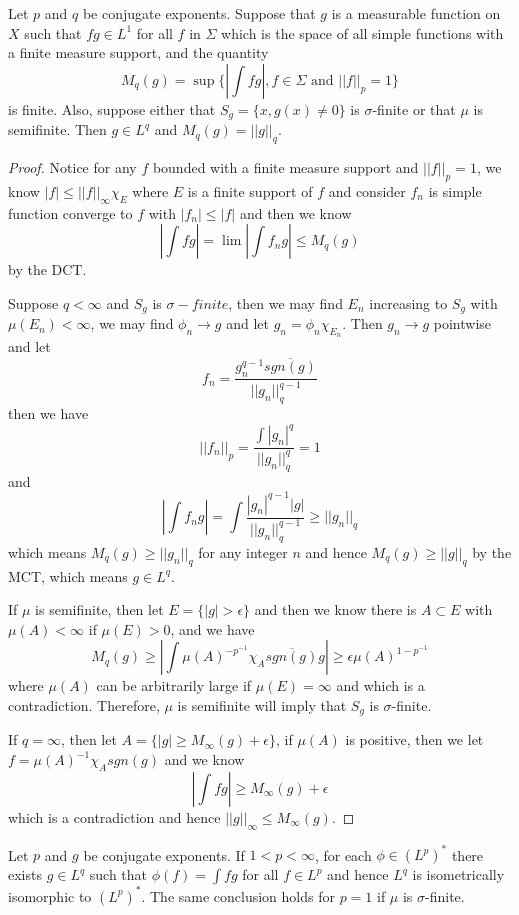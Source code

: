 \begin{theorem}
    Let $p$ and $q$ be conjugate exponents. Suppose that $g$ is a measurable function on $X$ such that $fg\in L^1$ for all $f$ in $\Sigma$ which is the space of all simple functions with a finite measure support, and the quantity
    \[M_q(g) = \sup \{|\int fg|, f\in\Sigma\text{ and }||f||_p = 1\}\]
    is finite. Also, suppose either that $S_g = \{x, g(x)\neq 0\}$ is $\sigma$-finite or that $\mu$ is semifinite. Then $g\in L^q$ and $M_q(g) = ||g||_q$.
\end{theorem}
\begin{proof}\par
    Notice for any $f$ bounded with a finite measure support and $||f||_p = 1$, we know $|f| \leq ||f||_{\infty}\chi_E$ where $E$ is a finite support of $f$ and consider $f_n$ is simple function converge to $f$ with $|f_n| \leq |f|$ and then we know
    \[
    |\int fg| = \lim |\int f_ng| \leq M_q(g)
    \] 
    by the DCT.\par
    Suppose $q < \infty$ and $S_g$ is $\sigma-finite$, then we may find $E_n$ increasing to $S_g$ with $\mu(E_n) <\infty$, we may find $\phi_n \to g$ and let $g_n = \phi_n\chi_{E_n}$. Then $g_n \to g$ pointwise and let
    \[
    f_n = \dfrac{g_n^{q-1}\overline{sgn(g)}}{||g_n||_q^{q-1}}
    \]
    then we have
    \[
    ||f_n||_p = \dfrac{\int |g_n|^q}{||g_n||_q^q} = 1
    \]
    and
    \[
    |\int f_n g| = \int \dfrac{|g_n|^{q-1}|g|}{||g_n||_q^{q-1}} \geq ||g_n||_q
    \]
    which means $M_q(g) \geq ||g_n||_q$ for any integer $n$ and hence $M_q(g) \geq ||g||_q$ by the MCT, which means $g\in L^q$.\par
    If $\mu$ is semifinite, then let $E = \{|g|>\epsilon\}$ and then we know there is $A\subset E$ with $\mu(A) < \infty$ if $\mu(E)>0$, and we have
    \[
    M_q(g) \geq |\int \mu(A)^{-p^{-1}}\chi_A\overline{sgn(g)} g| \geq \epsilon\mu(A)^{1-p^{-1}}
    \]
    where $\mu(A)$ can be arbitrarily large if $\mu(E) = \infty$ and which is a contradiction. Therefore, $\mu$ is semifinite will imply that $S_g$ is $\sigma$-finite.\par
    If $q = \infty$, then let $A = \{|g|\geq M_{\infty}(g)+\epsilon\}$, if $\mu(A)$ is positive, then we let $f = \mu(A)^{-1}\chi_A sgn(g)$ and we know
    \[|\int fg| \geq M_{\infty}(g)+\epsilon\]
    which is a contradiction and hence $||g||_{\infty} \leq M_{\infty}(g)$.
\end{proof}

\begin{theorem}
    Let $p$ and $g$ be conjugate exponents. If $1<p < \infty$, for each $\phi \in (L^p)^*$ there exists $g\in L^q$ such that $\phi(f) = \int fg$ for all $f\in L^p$ and hence $L^q$ is isometrically isomorphic to $(L^p)^*$. The same conclusion holds for $p=1$ if $\mu$ is $\sigma$-finite.
\end{theorem}


